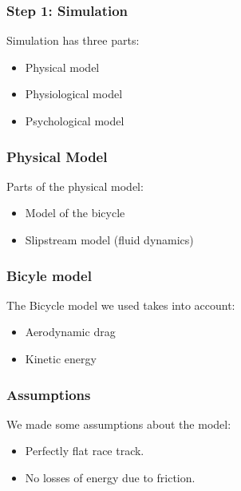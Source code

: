 \documentclass{beamer}
\begin{document}
\begin{frame}
\frametitle{Step 1: Simulation}
Simulation has three parts: \\
\pause
\vspace{0.7cm}
\begin{itemize}
\item Physical model
\pause
\vspace{0.7cm}
\item Physiological model
\pause
\vspace{0.7cm}
\item Psychological model
\end{itemize}
\end{frame}

\begin{frame}
\frametitle{Physical Model}

Parts of the physical model:
\vspace{2cm}
\begin{itemize}
\pause
\item Model of the bicycle
\vspace{1cm}
\item Slipstream model (fluid dynamics)
\end{itemize}

\end{frame}

\begin{frame}
\frametitle{Bicyle model}
The Bicycle model we used takes into account:
\begin{itemize}
\vspace{0.7cm}
\pause
\item Aerodynamic drag
\vspace{0.7cm}
\pause
\item Kinetic energy
\end{itemize}
\pause
\vspace{0.7cm}

\end{frame}

\begin{frame}
\frametitle{Assumptions}
We made some assumptions about the model:
\vspace{0.7cm}
\pause
\begin{itemize}
\item Perfectly flat race track.
\pause
\vspace{0.7cm}
\item No losses of energy due to friction.
\pause
\vspace{0.7cm}
\end{itemize}
\end{frame}
\end{document}
